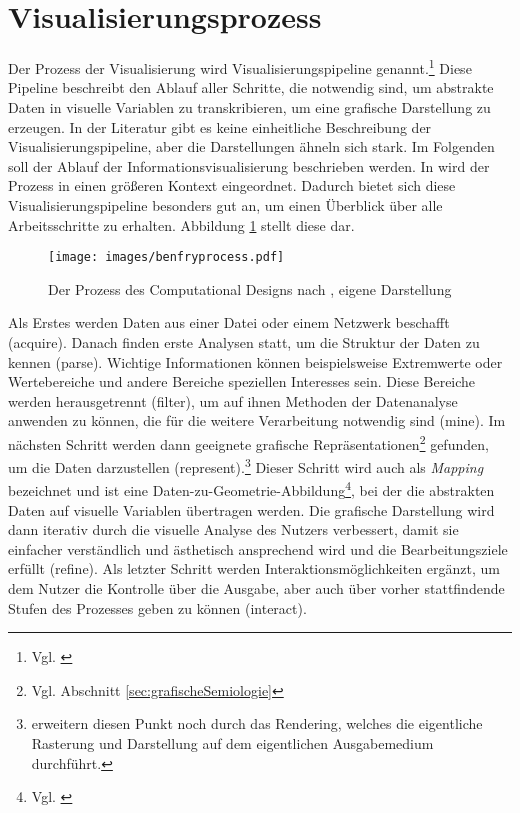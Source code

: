 \documentclass[a4paper, 
               12pt,
               DIV=calc,
               version=first,
               pdftex,
               headsepline,
               footsepline,
               bibtotocnumbered,
               liststotocnumbered]{scrreprt}
\begin{document}
\section{Visualisierungsprozess}
\label{sec:Pipeline}
Der Prozess der Visualisierung wird Visualisierungspipeline genannt.\footnote{Vgl. \citep[S.\,15]{Schumann}}
Diese Pipeline beschreibt den Ablauf aller
Schritte, die notwendig sind, um abstrakte Daten in visuelle Variablen
zu transkribieren, um eine grafische Darstellung zu erzeugen. In der Literatur gibt es keine einheitliche
Beschreibung der Visualisierungspipeline, aber die Darstellungen ähneln sich stark.
Im Folgenden soll der Ablauf der Informationsvisualisierung
beschrieben werden. In \citep{BenFry} wird der Prozess in einen
größeren Kontext eingeordnet. Dadurch bietet sich diese
Visualisierungspipeline besonders gut an, um einen Überblick über alle Arbeitsschritte zu erhalten. Abbildung \ref{fig:benfryprocess}
stellt diese dar.
\begin{figure}
\centering
\texttt{[image: images/benfryprocess.pdf]}
\caption{Der Prozess des Computational Designs nach \citep[S.\,13]{BenFry}, eigene Darstellung}
\label{fig:benfryprocess}
\end{figure}
Als Erstes werden Daten aus einer Datei oder einem Netzwerk
beschafft (acquire). Danach finden erste Analysen statt, um die Struktur der Daten zu kennen (parse).
Wichtige Informationen können beispielsweise Extremwerte oder Wertebereiche und andere Bereiche speziellen
Interesses sein.
Diese Bereiche werden herausgetrennt (filter), um auf ihnen Methoden der Datenanalyse anwenden zu können,
die für die weitere Verarbeitung notwendig sind (mine). Im nächsten Schritt werden dann geeignete
grafische Repräsentationen\footnote{Vgl. Abschnitt \ref{sec:grafischeSemiologie}} gefunden, um die Daten
darzustellen (represent).\footnote{\citep{Schumann} erweitern diesen Punkt noch durch das Rendering, welches die eigentliche Rasterung
und Darstellung auf dem eigentlichen Ausgabemedium durchführt.}
Dieser Schritt wird auch als \textit{Mapping} bezeichnet und ist eine
Daten-zu-Geometrie-Abbildung\footnote{Vgl. \citep[S.\,16]{Schumann}}, bei der
die abstrakten Daten auf visuelle Variablen übertragen werden.
Die grafische Darstellung wird dann iterativ durch die visuelle Analyse des Nutzers
verbessert, damit sie einfacher verständlich und ästhetisch ansprechend wird und die Bearbeitungsziele erfüllt (refine). Als letzter
Schritt werden Interaktionsmöglichkeiten ergänzt, um dem Nutzer die Kontrolle über die
Ausgabe, aber auch über vorher stattfindende Stufen des Prozesses geben zu können (interact).
\end{document}
